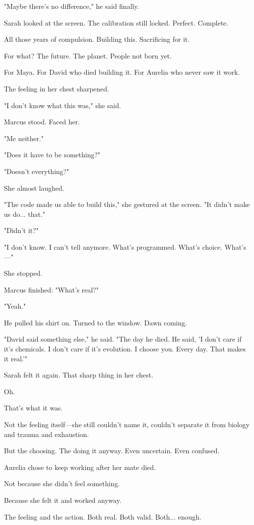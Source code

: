 "Maybe there's no difference," he said finally.

Sarah looked at the screen. The calibration still locked. Perfect. Complete.

All those years of compulsion. Building this. Sacrificing for it.

For what? The future. The planet. People not born yet.

For Maya. For David who died building it. For Aurelia who never saw it work.

The feeling in her chest sharpened.

"I don't know what this was," she said.

Marcus stood. Faced her.

"Me neither."

"Does it have to be something?"

"Doesn't everything?"

She almost laughed.

"The code made us able to build this," she gestured at the screen. "It didn't make us do... that."

"Didn't it?"

"I don't know. I can't tell anymore. What's programmed. What's choice. What's—"

She stopped.

Marcus finished: "What's real?"

"Yeah."

He pulled his shirt on. Turned to the window. Dawn coming.

"David said something else," he said. "The day he died. He said, 'I don't care if it's chemicals. I don't care if it's evolution. I choose you. Every day. That makes it real.'"

Sarah felt it again. That sharp thing in her chest.

Oh.

That's what it was.

Not the feeling itself—she still couldn't name it, couldn't separate it from biology and trauma and exhaustion.

But the choosing. The doing it anyway. Even uncertain. Even confused.

Aurelia chose to keep working after her mate died.

Not because she didn't feel something.

Because she felt it and worked anyway.

The feeling and the action. Both real. Both valid. Both... enough.

